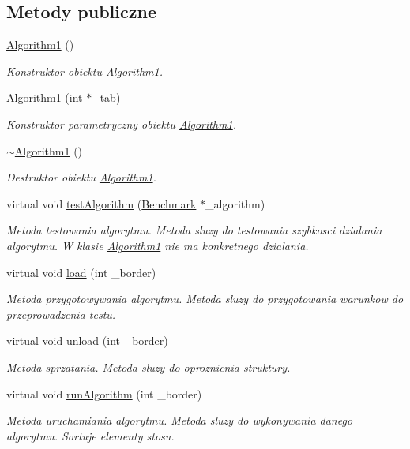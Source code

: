 \subsection*{Metody publiczne}
\begin{DoxyCompactItemize}
\item 
\hyperlink{class_algorithm1_ad2b1593378788a36b954b65d1c2af8ff}{Algorithm1} ()
\begin{DoxyCompactList}\small\item\em Konstruktor obiektu \hyperlink{class_algorithm1}{Algorithm1}. \end{DoxyCompactList}\item 
\hyperlink{class_algorithm1_ad2976b6058bd8886cfd20307e79b6042}{Algorithm1} (int $\ast$\-\_\-tab)
\begin{DoxyCompactList}\small\item\em Konstruktor parametryczny obiektu \hyperlink{class_algorithm1}{Algorithm1}. \end{DoxyCompactList}\item 
\hyperlink{class_algorithm1_afbd4d69811879472fcadb25a1c3c5262}{$\sim$\-Algorithm1} ()
\begin{DoxyCompactList}\small\item\em Destruktor obiektu \hyperlink{class_algorithm1}{Algorithm1}. \end{DoxyCompactList}\item 
virtual void \hyperlink{class_algorithm1_a35260610f8093c3812a6f146147955e6}{test\-Algorithm} (\hyperlink{class_benchmark}{Benchmark} $\ast$\-\_\-algorithm)
\begin{DoxyCompactList}\small\item\em Metoda testowania algorytmu. Metoda sluzy do testowania szybkosci dzialania algorytmu. W klasie \hyperlink{class_algorithm1}{Algorithm1} nie ma konkretnego dzialania. \end{DoxyCompactList}\item 
virtual void \hyperlink{class_algorithm1_a008c8fdd07c39219099afe14e63e447a}{load} (int \-\_\-border)
\begin{DoxyCompactList}\small\item\em Metoda przygotowywania algorytmu. Metoda sluzy do przygotowania warunkow do przeprowadzenia testu. \end{DoxyCompactList}\item 
virtual void \hyperlink{class_algorithm1_a135dd26c6c741812d75cd7f2f270592d}{unload} (int \-\_\-border)
\begin{DoxyCompactList}\small\item\em Metoda sprzatania. Metoda sluzy do oproznienia struktury. \end{DoxyCompactList}\item 
virtual void \hyperlink{class_algorithm1_a671a2162843b588704044420c9a5dfa9}{run\-Algorithm} (int \-\_\-border)
\begin{DoxyCompactList}\small\item\em Metoda uruchamiania algorytmu. Metoda sluzy do wykonywania danego algorytmu. Sortuje elementy stosu. \end{DoxyCompactList}\end{DoxyCompactItemize}
